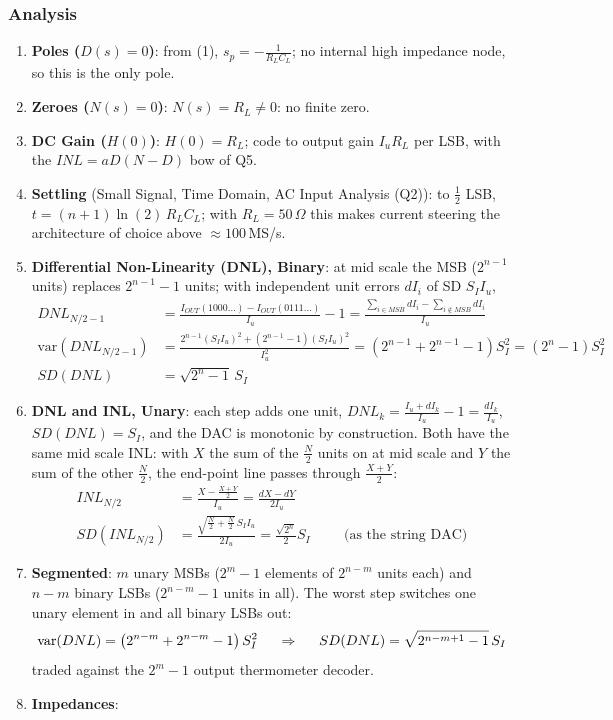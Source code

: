 \subsubsection{Analysis}
\begin{enumerate}
  \item \textbf{Poles (\(D(s) = 0\))}: from (1), \(s_p = -\frac{1}{R_L C_L}\); no internal high impedance
    node, so this is the only pole.
  \item \textbf{Zeroes (\(N(s) = 0\))}: \(N(s) = R_L \neq 0\): no finite zero.
  \item \textbf{DC Gain (\(H(0)\))}: \(H(0) = R_L\); code to output gain \(I_u R_L\) per LSB, with the
    \(INL = a D (N - D)\) bow of Q5.
  \item \textbf{Settling} (Small Signal, Time Domain, AC Input Analysis (Q2)): to \(\frac{1}{2}\) LSB,
    \(t = (n + 1)\ln(2)\, R_L C_L\); with \(R_L = 50\,\Omega\) this makes current steering the architecture
    of choice above \(\approx 100\,\)MS/s.
  \item \textbf{Differential Non-Linearity (DNL), Binary}: at mid scale the MSB (\(2^{n-1}\) units) replaces
    \(2^{n-1} - 1\) units; with independent unit errors \(dI_i\) of SD \(S_I I_u\),
    \begin{align*}
      DNL_{N/2-1} &= \frac{I_{OUT}(1000\ldots) - I_{OUT}(0111\ldots)}{I_u} - 1
      = \frac{\sum_{i \in MSB} dI_i - \sum_{i \notin MSB} dI_i}{I_u} \\
      \text{var}(DNL_{N/2-1}) &= \frac{2^{n-1} (S_I I_u)^2 + (2^{n-1} - 1)(S_I I_u)^2}{I_u^2} = (2^{n-1} + 2^{n-1} - 1) S_I^2 = (2^n - 1) S_I^2 \\
      SD(DNL) &= \sqrt{2^n - 1}\, S_I
    \end{align*}
  \item \textbf{DNL and INL, Unary}: each step adds one unit,
    \(DNL_k = \frac{I_u + dI_k}{I_u} - 1 = \frac{dI_k}{I_u}\), \(SD(DNL) = S_I\), and the
    DAC is monotonic by construction. Both have the same mid scale INL: with
    \(X\) the sum of the \(\frac{N}{2}\) units on at mid scale and \(Y\) the sum
    of the other \(\frac{N}{2}\), the end-point line passes through \(\frac{X + Y}{2}\):
    \begin{align*}
      INL_{N/2} &= \frac{X - \frac{X + Y}{2}}{I_u} = \frac{dX - dY}{2 I_u} \\
      SD(INL_{N/2}) &= \frac{\sqrt{\frac{N}{2} + \frac{N}{2}}\, S_I I_u}{2 I_u} = \frac{\sqrt{2^n}}{2} S_I
      \hspace{1cm} \text{(as the string DAC)}
    \end{align*}
  \item \textbf{Segmented}: \(m\) unary MSBs (\(2^m - 1\) elements of
    \(2^{n-m}\) units each) and \(n - m\) binary LSBs (\(2^{n-m} - 1\) units in all).
    The worst step switches one unary element in and all binary LSBs out:
    \[
      \text{var}(DNL) = \left(2^{n-m} + 2^{n-m} - 1\right) S_I^2 \hspace{0.5cm} \Rightarrow \hspace{0.5cm}
      SD(DNL) = \sqrt{2^{n-m+1} - 1}\, S_I
    \]
    traded against the \(2^m - 1\) output thermometer decoder.
  \item \textbf{Impedances}:

\end{enumerate}
